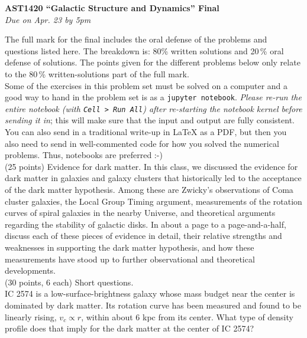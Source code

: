 \documentclass[12pt]{article}
\begin{document}
\begin{center}
{\bf \LARGE AST1420 ``Galactic Structure and Dynamics'' Final}\\[7pt]
\emph{Due on Apr. 23 by 5pm}\\[7pt]
\end{center}

The full mark for the final includes the oral defense of the problems and questions
listed here. The breakdown is: 80\% written solutions and 20\,\% oral
defense of solutions. The points given for the different problems
below only relate to the 80\,\% written-solutions part of the full
mark.\\

Some of the exercises in this problem set must be solved on a computer
and a good way to hand in the problem set is as a \texttt{jupyter
  notebook}. \emph{Please re-run the entire notebook (with \texttt{Cell
    > Run All}) after re-starting the notebook kernel before sending
  it in}; this will make sure that the input and output are fully
consistent. You can also send in a traditional write-up in LaTeX as a PDF, 
but then you also need to send in well-commented code for how you solved 
the numerical problems. Thus, notebooks are preferred :-)\\

 (25 points) Evidence for dark matter. In this class, we 
discussed the evidence for dark matter in galaxies and galaxy clusters that historically
led to the acceptance of the dark matter hypothesis. Among these are Zwicky's observations
of Coma cluster galaxies, the Local Group Timing argument, measurements of the rotation curves 
of spiral galaxies in the nearby Universe, and theoretical arguments regarding the 
stability of galactic disks. In about a page to a page-and-a-half, discuss each of these 
pieces of evidence in detail, their relative strengths and weaknesses in supporting the
dark matter hypothesis, and how these measurements have stood up to further observational 
and theoretical developments.\\

 (30 points, 6 each) Short questions.\\

 IC 2574 is a low-surface-brightness galaxy whose mass budget near the 
center is dominated by dark matter. Its rotation curve has been measured and found to be 
linearly rising, $v_c \propto r$, within about 6 kpc from its center. What type of 
density profile does that imply for the dark matter at the center of IC 2574?\\
\end{document}
